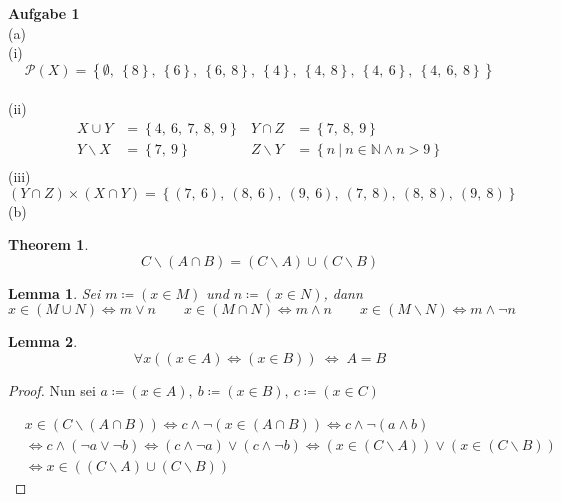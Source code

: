 \documentclass[a4paper, 12pt]{scrartcl}
\theoremstyle{plain}
\newtheorem{theorem}[part]{Theorem}
\newtheorem{lemma}[theorem]{Lemma}
\begin{document}
\textbf{Aufgabe 1}\\
(a)\\
(i)
\[ \mathcal{P}(X) = \left\{ \emptyset,
\ \left\{  8 \right\},
\ \left\{  6 \right\},
\ \left\{  6,\ 8 \right\},
\ \left\{ 4 \right\},
\ \left\{ 4,\ 8 \right\},
\ \left\{ 4,\ 6 \right\},
\ \left\{ 4,\ 6,\ 8 \right\}
 \right\} \]\\
(ii)
\begin{align*}
	X \cup Y &= \left\{ 4,\ 6,\ 7, \ 8,\ 9 \right\} & Y \cap Z &= \left\{ 7,\ 8,\ 9 \right\} \\ Y \backslash X &= \left\{ 7,\ 9 \right\} & Z \backslash Y &= \left\{ n \:\vert\: n \in \mathbb{N} \wedge n > 9 \right\} \\
\end{align*}
(iii) \[ (Y \cap Z) \times (X \cap Y) =  \left\{ (7, \ 6),\ (8, \ 6),\ (9, \ 6),\ (7, \ 8),\ (8, \ 8),\ (9, \ 8) \right\} \]
(b)\\
\begin{theorem}
	\[ C \backslash (A \cap B) = (C \backslash A) \cup (C \backslash B) \]
\end{theorem}
\begin{lemma}
Sei $ m \coloneqq (x \in M)$ und  $n \coloneqq (x \in N)$, dann
\[ x \in (M \cup N) \Leftrightarrow m \vee n \qquad x \in (M \cap N) \Leftrightarrow m \wedge n \qquad x  \in (M \backslash N) \Leftrightarrow m \wedge \neg n \]
\end{lemma}
\begin{lemma}
\[ \forall x ((x \in A) \Leftrightarrow (x \in B)) \:\Leftrightarrow\; A = B \]
\end{lemma}

\begin{proof}
	
Nun sei $a \coloneqq (x \in A), \ b \coloneqq (x \in B), \ c \coloneqq (x \in C)$

\begin{align*}
	&x \in (C \backslash (A \cap B)) \Leftrightarrow c \wedge \neg(x \in (A \cap B)) \Leftrightarrow c \wedge \neg(a \wedge b) \\
	&\Leftrightarrow c \wedge (\neg a \vee \neg b) \Leftrightarrow (c \wedge \neg a) \vee (c \wedge \neg b) \Leftrightarrow (x \in (C \backslash A)) \vee (x \in (C \backslash B)) \\
	&\Leftrightarrow x \in ((C \backslash A) \cup (C \backslash B))
\end{align*}
\end{proof}
\end{document}
